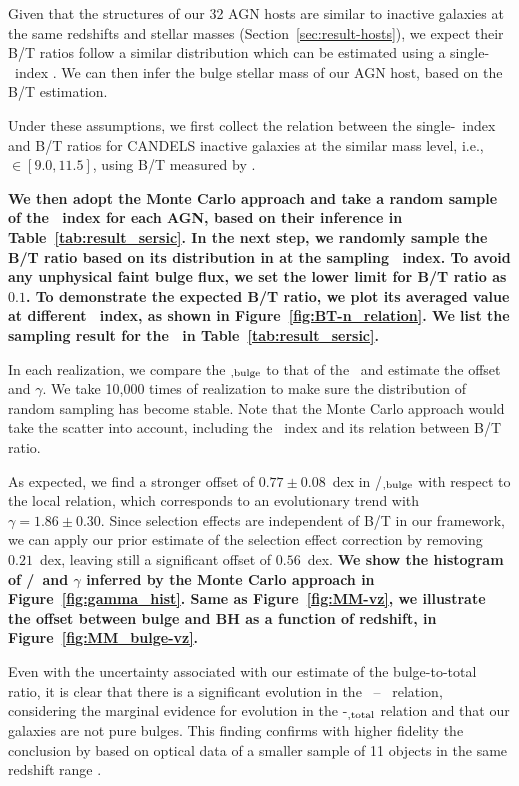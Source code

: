 \documentclass[apj]{emulateapj}
\begin{document}
Given that the structures of our 32 AGN hosts are similar to inactive
galaxies at the same redshifts and stellar masses
(Section~\ref{sec:result-hosts}), we expect their B/T ratios follow
a similar distribution which can be estimated using a single-\sersic\
index \citep{Bruce2014}. We can then infer the bulge stellar mass of our
AGN host, based on the B/T estimation.

Under these assumptions, we first collect the relation between the
single-\sersic\ index and B/T ratios for CANDELS inactive galaxies
at the similar mass level, i.e., \smass$\in [9.0, 11.5]$, using B/T
measured by \citet{Dimauro2018}. {\bf We then adopt the Monte Carlo approach
and take a random sample of the \sersic\ index for each AGN, based on their
inference in Table~\ref{tab:result_sersic}. In the next step, we randomly
sample the B/T ratio based on its distribution in \citet{Dimauro2018}
at the sampling \sersic\ index. To avoid any unphysical faint bulge flux, we
set the lower limit for B/T ratio as $0.1$. 
To demonstrate the expected B/T ratio, we plot its averaged value at
different \sersic\ index, as shown in Figure~\ref{fig:BT-n_relation}. 
We list the sampling result for the \bmass\ in Table~\ref{tab:result_sersic}.

In each realization, we compare the
\smass$_{\rm, bulge}$ to that of the \mbh\ and estimate the offset and $\gamma$. 
We take 10,000 times of realization to make sure the distribution of
random sampling has become stable. Note that the Monte Carlo approach would
take the scatter into account, including the \sersic\ index
and its relation between B/T ratio.
} 

As expected, we find a stronger offset of
$0.77\pm0.08$~dex in \mbh/\smass$_{\rm, bulge}$ with respect to the
local relation, which corresponds to an evolutionary trend with
$\gamma = 1.86\pm0.30$. Since selection effects are independent of B/T in
our framework, we can apply our prior estimate of the selection
effect correction by removing $0.21$~dex, leaving still a significant offset
of $0.56$~dex. {\bf We show the histogram of  \mbh/\smass\ and $\gamma$ inferred by
the Monte Carlo approach in Figure~\ref{fig:gamma_hist}. Same as
Figure~\ref{fig:MM-vz}, we illustrate the offset between bulge and BH
as a function of redshift, in Figure~\ref{fig:MM_bulge-vz}.}

Even with the uncertainty associated with our estimate of the
bulge-to-total ratio, it is clear that there is a significant evolution
in the \mbh\ -- \bmass\ relation, considering the
marginal evidence for evolution in the \mbh-\smass$_{\rm, total}$
relation and that our galaxies are not pure bulges. This finding
confirms with higher fidelity the conclusion by \citet{Bennert11}
based on optical data of a smaller sample of 11 objects in the same
redshift range \citep[see][for similar results]{SS13, Jah++09, Cisternas2011}.
\end{document}
